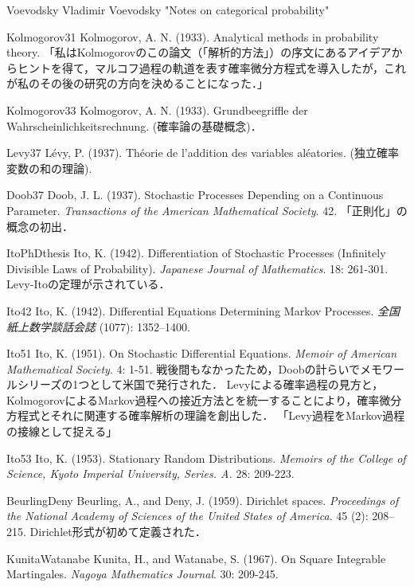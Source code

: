 \documentclass[uplatex,dvipdfmx]{jsreport}
\begin{document}
\begin{thebibliography}{99}
    \item{Voevodsky}
    Vladimir Voevodsky "Notes on categorical probability"



    \item{Kolmogorov31}
    Kolmogorov, A. N. (1933). Analytical methods in probability theory. 「私はKolmogorovのこの論文（「解析的方法」）の序文にあるアイデアからヒントを得て，マルコフ過程の軌道を表す確率微分方程式を導入したが，これが私のその後の研究の方向を決めることになった．」
    \item{Kolmogorov33}
    Kolmogorov, A. N. (1933). Grundbeegriffle der Wahrscheinlichkeitsrechnung. (確率論の基礎概念)．
    \item{Levy37}
    Lévy, P. (1937). Théorie de l'addition des variables aléatories. (独立確率変数の和の理論).
    \item{Doob37}
    Doob, J. L. (1937). Stochastic Processes Depending on a Continuous Parameter. \textit{Transactions of the American Mathematical Society}. 42. 「正則化」の概念の初出．
    \item{ItoPhDthesis}
    Ito, K. (1942). Diﬀerentiation of Stochastic Processes (Infinitely Divisible Laws of Probability). \textit{Japanese Journal of Mathematics}. 18: 261-301. Levy-Itoの定理が示されている．
    \item{Ito42}
    Ito, K. (1942). Differential Equations Determining Markov Processes. \textit{全国紙上数学談話会誌} (1077): 1352–1400.
    \item{Ito51}
    Ito, K. (1951). On Stochastic Differential Equations. \textit{Memoir of American Mathematical Society}. 4: 1-51. 戦後間もなかったため，Doobの計らいでメモワールシリーズの1つとして米国で発行された．
    Levyによる確率過程の見方と，KolmogorovによるMarkov過程への接近方法とを統一することにより，確率微分方程式とそれに関連する確率解析の理論を創出した．
    「Levy過程をMarkov過程の接線として捉える」
    \item{Ito53}
    Ito, K. (1953). Stationary Random Distributions. \textit{Memoirs of the College of Science, Kyoto Imperial University, Series. A.} 28: 209-223.
    \item{BeurlingDeny}
    Beurling, A., and Deny, J. (1959). Dirichlet spaces. \textit{Proceedings of the National Academy of Sciences of the United States of America}. 45 (2): 208–215. Dirichlet形式が初めて定義された．
    \item{KunitaWatanabe}
    Kunita, H., and Watanabe, S. (1967). On Square Integrable Martingales. \textit{Nagoya Mathematics Journal}. 30: 209-245.

\end{thebibliography}
\end{document}
